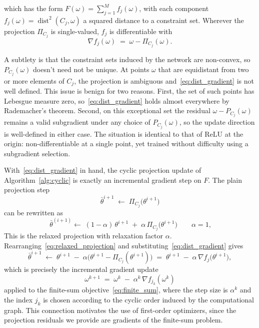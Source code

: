 \documentclass{article}
\newcommand{\dist}{\operatorname{dist}}
\begin{document}
which has the form $F(\omega) = \sum_{j=1}^{M} f_j(\omega)$, with each component $f_j(\omega) = \dist^{2}(C_j, \omega)$ a squared distance to a constraint set. Wherever the projection $\Pi_{C_j}$ is single-valued, $f_j$ is differentiable with
\begin{equation}
    \nabla f_j(\omega) \;=\; \omega - \Pi_{C_j}(\omega).
    \label{eq:dist_gradient}
\end{equation}

A subtlety is that the constraint sets induced by the network are non-convex, so $P_{C_j}(\omega)$ doesn't need not be unique. At points $\omega$ that are equidistant from two or more elements of $C_j$, the projection is ambiguous and~\eqref{eq:dist_gradient} is not well defined. This issue is benign for two reasons. First, the set of such points has Lebesgue measure zero, so~\eqref{eq:dist_gradient} holds almost everywhere by Rademacher's theorem. Second, on this exceptional set the residual $\omega - P_{C_j}(\omega)$ remains a valid subgradient under any choice of $P_{C_j}(\omega)$, so the update direction is well-defined in either case. The situation is identical to that of $\mathrm{ReLU}$ at the origin: non-differentiable at a single point, yet trained without difficulty using a subgradient selection.

With~\eqref{eq:dist_gradient} in hand, the cyclic projection update of Algorithm~\ref{alg:cyclic} is exactly an incremental gradient step on $F$. The plain projection step
\begin{equation}
    \bar \theta^{i+1} \;\gets\; \Pi_{C_j}\!\bigl(\theta^{i+1}\bigr)
    \label{eq:plain_projection}
\end{equation}
can be rewritten as
\begin{equation} \
    \bar \theta^{(i+1)}\gets\; (1-\alpha)\,\theta^{i+1} \;+\; \alpha\, \Pi_{C_j}\!\bigl(\theta^{i+1}\bigr)
    \qquad \alpha = 1,
    \label{eq:relaxed_projection}
\end{equation}
This is the relaxed projection with relaxation factor $\alpha$. Rearranging~\eqref{eq:relaxed_projection} and substituting~\eqref{eq:dist_gradient} gives
\begin{equation}
    \bar \theta^{i+1} \;\gets\; \theta^{i+1} \;-\; \alpha\bigl(\theta^{i+1} - \Pi_{C_j}(\theta^{i+1})\bigr) \;=\; \theta^{i+1} \;-\; \alpha\,\nabla f_j\!\bigl(\theta^{i+1}\bigr),
    \label{eq:projection_as_gradient_step}
\end{equation}
which is precisely the incremental gradient update~\cite[Eq.~(2.78)]{bertsekas1997nonlinear}
\begin{equation}
    \omega^{k+1} \;=\; \omega^{k} \;-\; \alpha^{k}\,\nabla f_{j_k}(\omega^{k})
    \label{eq:incremental_gradient}
\end{equation}
applied to the finite-sum objective~\eqref{eq:finite_sum}, where the step size is $\alpha^k$ and the index $j_k$ is chosen according to the cyclic order induced by the computational graph. This connection motivates the use of first-order optimizers, since the projection residuals we provide are gradients of the finite-sum problem.
\end{document}
